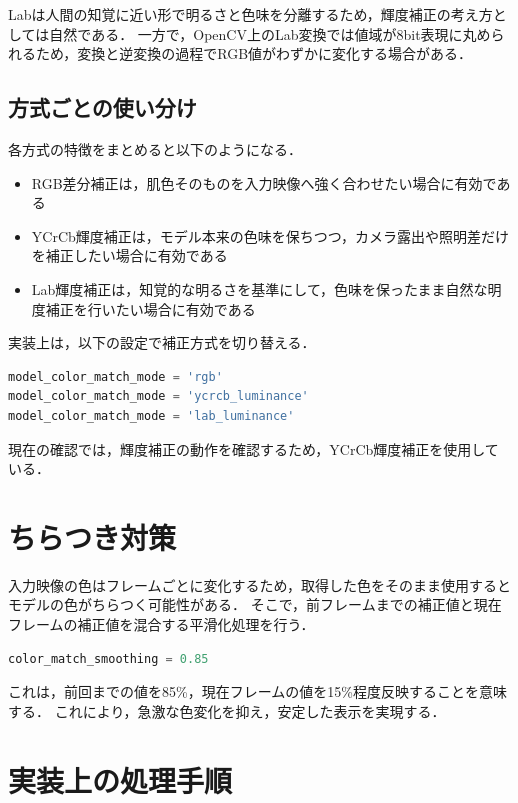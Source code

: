 \documentclass[uplatex,dvipdfmx]{jsarticle}
\begin{document}
Labは人間の知覚に近い形で明るさと色味を分離するため，輝度補正の考え方としては自然である．
一方で，OpenCV上のLab変換では値域が8bit表現に丸められるため，変換と逆変換の過程でRGB値がわずかに変化する場合がある．

\subsection{方式ごとの使い分け}

各方式の特徴をまとめると以下のようになる．

\begin{itemize}
  \item RGB差分補正は，肌色そのものを入力映像へ強く合わせたい場合に有効である
  \item YCrCb輝度補正は，モデル本来の色味を保ちつつ，カメラ露出や照明差だけを補正したい場合に有効である
  \item Lab輝度補正は，知覚的な明るさを基準にして，色味を保ったまま自然な明度補正を行いたい場合に有効である
\end{itemize}

実装上は，以下の設定で補正方式を切り替える．

\begin{lstlisting}[language=Python]
model_color_match_mode = 'rgb'
model_color_match_mode = 'ycrcb_luminance'
model_color_match_mode = 'lab_luminance'
\end{lstlisting}

現在の確認では，輝度補正の動作を確認するため，YCrCb輝度補正を使用している．

\section{ちらつき対策}

入力映像の色はフレームごとに変化するため，取得した色をそのまま使用するとモデルの色がちらつく可能性がある．
そこで，前フレームまでの補正値と現在フレームの補正値を混合する平滑化処理を行う．

\begin{lstlisting}[language=Python]
color_match_smoothing = 0.85
\end{lstlisting}

これは，前回までの値を85\%，現在フレームの値を15\%程度反映することを意味する．
これにより，急激な色変化を抑え，安定した表示を実現する．

\section{実装上の処理手順}
\end{document}

